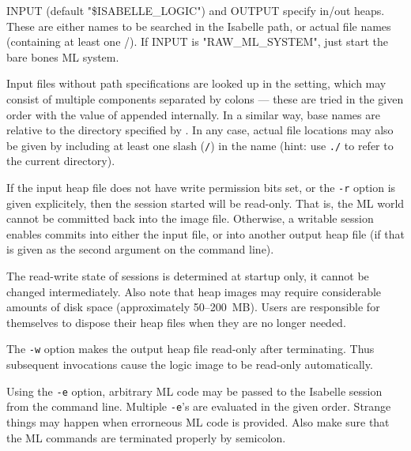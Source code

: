 \begin{isabellebody}
\begin{isamarkuptext}
\begin{ttbox}
  INPUT (default "\$ISABELLE_LOGIC") and OUTPUT specify in/out heaps.
  These are either names to be searched in the Isabelle path, or
  actual file names (containing at least one /).
  If INPUT is "RAW_ML_SYSTEM", just start the bare bones ML system.
\end{ttbox}

  Input files without path specifications are looked up in the
  \hyperlink{setting.ISABELLE-PATH}{\mbox{}} setting, which may consist of multiple
  components separated by colons --- these are tried in the given
  order with the value of \hyperlink{setting.ML-IDENTIFIER}{\mbox{}} appended
  internally.  In a similar way, base names are relative to the
  directory specified by \hyperlink{setting.ISABELLE-OUTPUT}{\mbox{}}.  In any case,
  actual file locations may also be given by including at least one
  slash (\verb|/|) in the name (hint: use \verb|./| to
  refer to the current directory).%
\end{isamarkuptext}%
\isamarkuptrue%
%
\isamarkuptrue%
%
\begin{isamarkuptext}%
If the input heap file does not have write permission bits set, or
  the \verb|-r| option is given explicitely, then the session
  started will be read-only.  That is, the ML world cannot be
  committed back into the image file.  Otherwise, a writable session
  enables commits into either the input file, or into another output
  heap file (if that is given as the second argument on the command
  line).

  The read-write state of sessions is determined at startup only, it
  cannot be changed intermediately. Also note that heap images may
  require considerable amounts of disk space (approximately
  50--200~MB). Users are responsible for themselves to dispose their
  heap files when they are no longer needed.

  \medskip The \verb|-w| option makes the output heap file
  read-only after terminating.  Thus subsequent invocations cause the
  logic image to be read-only automatically.

  \medskip Using the \verb|-e| option, arbitrary ML code may be
  passed to the Isabelle session from the command line. Multiple
  \verb|-e|'s are evaluated in the given order. Strange things
  may happen when errorneous ML code is provided. Also make sure that
  the ML commands are terminated properly by semicolon.


\end{isamarkuptext}
\end{isabellebody}
